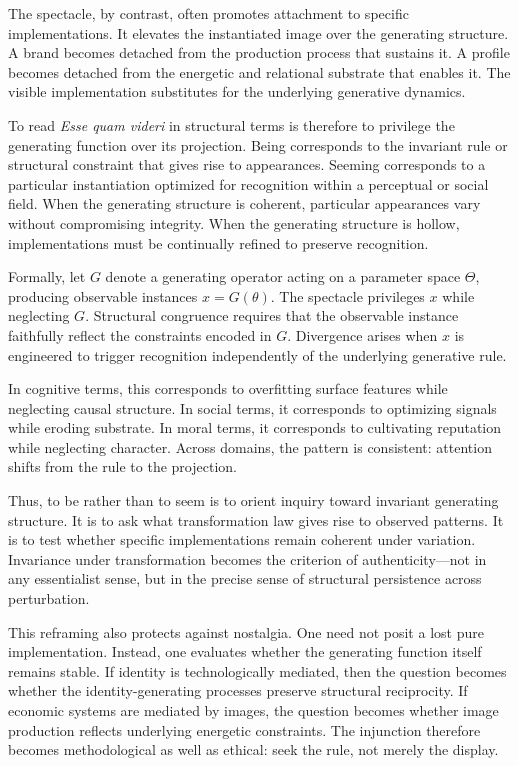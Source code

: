 \documentclass[11pt]{article}
\begin{document}
The spectacle, by contrast, often promotes attachment to specific implementations. It elevates the instantiated image over the generating structure. A brand becomes detached from the production process that sustains it. A profile becomes detached from the energetic and relational substrate that enables it. The visible implementation substitutes for the underlying generative dynamics.

To read \textit{Esse quam videri} in structural terms is therefore to privilege the generating function over its projection. Being corresponds to the invariant rule or structural constraint that gives rise to appearances. Seeming corresponds to a particular instantiation optimized for recognition within a perceptual or social field. When the generating structure is coherent, particular appearances vary without compromising integrity. When the generating structure is hollow, implementations must be continually refined to preserve recognition.

Formally, let $G$ denote a generating operator acting on a parameter space $\Theta$, producing observable instances $x = G(\theta)$. The spectacle privileges $x$ while neglecting $G$. Structural congruence requires that the observable instance faithfully reflect the constraints encoded in $G$. Divergence arises when $x$ is engineered to trigger recognition independently of the underlying generative rule.

In cognitive terms, this corresponds to overfitting surface features while neglecting causal structure. In social terms, it corresponds to optimizing signals while eroding substrate. In moral terms, it corresponds to cultivating reputation while neglecting character. Across domains, the pattern is consistent: attention shifts from the rule to the projection.

Thus, to be rather than to seem is to orient inquiry toward invariant generating structure. It is to ask what transformation law gives rise to observed patterns. It is to test whether specific implementations remain coherent under variation. Invariance under transformation becomes the criterion of authenticity---not in any essentialist sense, but in the precise sense of structural persistence across perturbation.

This reframing also protects against nostalgia. One need not posit a lost pure implementation. Instead, one evaluates whether the generating function itself remains stable. If identity is technologically mediated, then the question becomes whether the identity-generating processes preserve structural reciprocity. If economic systems are mediated by images, the question becomes whether image production reflects underlying energetic constraints. The injunction therefore becomes methodological as well as ethical: seek the rule, not merely the display.
\end{document}
